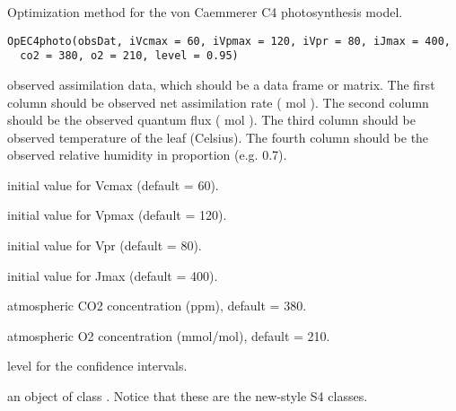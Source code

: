 \documentclass[letterpaper]{book}
\begin{document}
%
\begin{Description}\relax
Optimization method for the von Caemmerer C4 photosynthesis
model.
\end{Description}
%
\begin{Usage}
\begin{verbatim}
OpEC4photo(obsDat, iVcmax = 60, iVpmax = 120, iVpr = 80, iJmax = 400,
  co2 = 380, o2 = 210, level = 0.95)
\end{verbatim}
\end{Usage}
%
\begin{Arguments}
\begin{ldescription}
\item[\code{obsDat}] observed assimilation data, which should be
a data frame or matrix.  The first column should be
observed net assimilation rate (\eqn{\mu}{} mol
 ).  The second column should be
the observed quantum flux (\eqn{\mu}{} mol 
).  The third column should be observed
temperature of the leaf (Celsius).  The fourth column
should be the observed relative humidity in proportion
(e.g. 0.7).

\item[\code{iVcmax}] initial value for Vcmax (default = 60).

\item[\code{iVpmax}] initial value for Vpmax (default = 120).

\item[\code{iVpr}] initial value for Vpr (default = 80).

\item[\code{iJmax}] initial value for Jmax (default = 400).

\item[\code{co2}] atmospheric CO2 concentration (ppm), default =
380.

\item[\code{o2}] atmospheric O2 concentration (mmol/mol),
default = 210.

\item[\code{level}] level for the confidence intervals.
\end{ldescription}
\end{Arguments}
%
\begin{Value}
an object of class . Notice that
these are the new-style S4 classes.
\end{Value}
\end{document}
